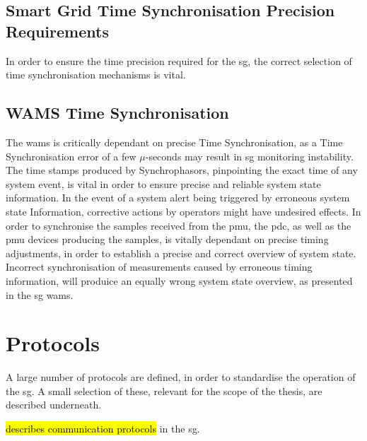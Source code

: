 \subsection[Smart Grid Time Sync Precision Requirements]{Smart Grid Time Synchronisation Precision Requirements}

In order to ensure the time precision required for the \acrshort{sg}, the correct selection of time synchronisation mechanisms is vital. 





\subsection{WAMS Time Synchronisation}



The \acrlong{wams} is critically dependant on precise Time Synchronisation, as a Time Synchronisation error of a few $\mu$-seconds may result in \acrshort{sg} monitoring instability. The time stamps produced by Synchrophasors, pinpointing the exact time of any system event, is vital in order to ensure precise and reliable system state information.
In the event of a system alert being triggered by erroneous system state Information, corrective actions by operators might have undesired effects. In order to synchronise the samples received from the \acrshort{pmu}, the \acrshort{pdc}, as well as the \acrshort{pmu} devices producing the samples, is vitally dependant on precise timing adjustments, in order to establish a precise and correct overview of system state. Incorrect synchronisation of measurements caused by erroneous timing information, will produice an equally wrong system state overview, as presented in the \acrshort{sg} \acrshort{wams}. \\ 



\section{Protocols}
A large number of protocols are defined, in order to standardise the operation of the \acrlong{sg}.
A small selection of these, relevant for the scope of the thesis, are described underneath.

\cite{2021arXiv210311657E} \hl{describes communication protocols} in the  \acrshort{sg}.











